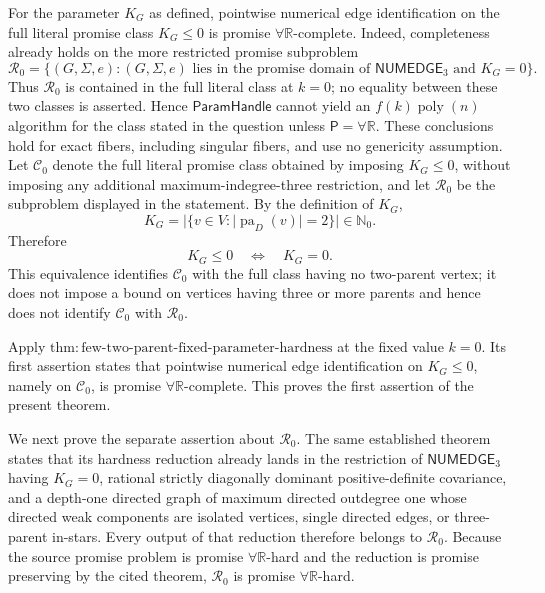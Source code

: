 For the parameter \(K_G\) as defined, pointwise numerical edge identification on the full literal promise class \(K_G\leq 0\) is promise \(\forall\mathbb R\)-complete.  Indeed, completeness already holds on the more restricted promise subproblem
\[
\mathcal R_0
=
\bigl\{(G,\Sigma,e):(G,\Sigma,e)\text{ lies in the promise domain of }\mathsf{NUMEDGE}_3\text{ and }K_G=0\bigr\}.
\]
Thus \(\mathcal R_0\) is contained in the full literal class at \(k=0\); no equality between these two classes is asserted.  Hence \(\mathsf{ParamHandle}\) cannot yield an \(f(k)\operatorname{poly}(n)\) algorithm for the class stated in the question unless \(\mathsf P=\forall\mathbb R\).  These conclusions hold for exact fibers, including singular fibers, and use no genericity assumption.
Let \(\mathcal C_0\) denote the full literal promise class obtained by imposing \(K_G\leq 0\), without imposing any additional maximum-indegree-three restriction, and let \(\mathcal R_0\) be the subproblem displayed in the statement.  By the definition of \(K_G\),
\[
K_G=\bigl\lvert\{v\in V:\lvert\operatorname{pa}_D(v)\rvert=2\}\bigr\rvert\in\mathbb N_0.
\]
Therefore
\[
K_G\leq 0\quad\Longleftrightarrow\quad K_G=0.
\]
This equivalence identifies \(\mathcal C_0\) with the full class having no two-parent vertex; it does not impose a bound on vertices having three or more parents and hence does not identify \(\mathcal C_0\) with \(\mathcal R_0\).

Apply \(\mathrm{thm:few\mbox{-}two\mbox{-}parent\mbox{-}fixed\mbox{-}parameter\mbox{-}hardness}\) at the fixed value \(k=0\).  Its first assertion states that pointwise numerical edge identification on \(K_G\leq 0\), namely on \(\mathcal C_0\), is promise \(\forall\mathbb R\)-complete.  This proves the first assertion of the present theorem.

We next prove the separate assertion about \(\mathcal R_0\).  The same established theorem states that its hardness reduction already lands in the restriction of \(\mathsf{NUMEDGE}_3\) having \(K_G=0\), rational strictly diagonally dominant positive-definite covariance, and a depth-one directed graph of maximum directed outdegree one whose directed weak components are isolated vertices, single directed edges, or three-parent in-stars.  Every output of that reduction therefore belongs to \(\mathcal R_0\).  Because the source promise problem is promise \(\forall\mathbb R\)-hard and the reduction is promise preserving by the cited theorem, \(\mathcal R_0\) is promise \(\forall\mathbb R\)-hard.

